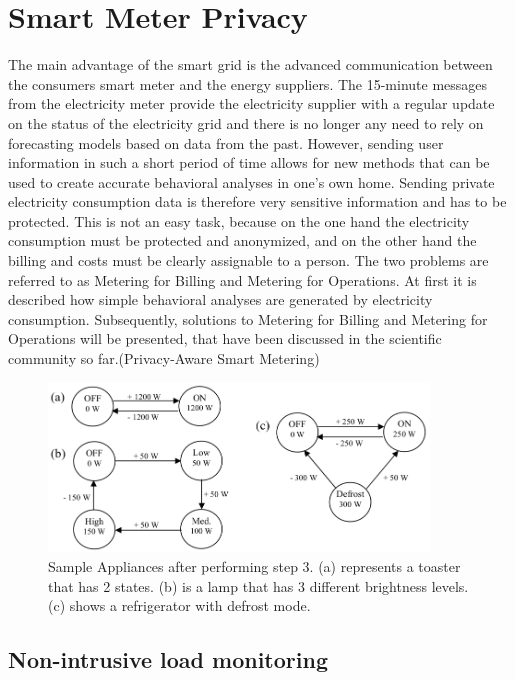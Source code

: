 \section{Smart Meter Privacy}
The main advantage of the smart grid is the advanced communication between the consumers smart meter and the energy suppliers. The 15-minute messages from the electricity meter provide the electricity supplier with a regular update on the status of the electricity grid and there is no longer any need to rely on forecasting models based on data from the past. However, sending user information in such a short period of time allows for new methods that can be used to create accurate behavioral analyses in one's own home. Sending private electricity consumption data is therefore very sensitive information and has to be protected. This is not an easy task, because on the one hand the electricity consumption must be protected and anonymized, and on the other hand the billing and costs must be clearly assignable to a person. The two problems are referred to as Metering for Billing and Metering for Operations. At first it is described how simple behavioral analyses are generated by electricity consumption. Subsequently, solutions to Metering for Billing and Metering for Operations will be presented, that have been discussed in the scientific community so far.(Privacy-Aware Smart Metering) \begin{figure}[htbp!]
  \centering
  \includegraphics[width=0.9\textwidth]{images/Appliance_Model.png}
  \caption[Appliance Model]{Sample Appliances after performing step 3. (a) represents a toaster that has 2 states. (b) is a lamp that has 3 different brightness levels. (c) shows a refrigerator with defrost mode.}
  \label{fig:Appliance_Model}
\end{figure}
\subsection{Non-intrusive load monitoring} 

